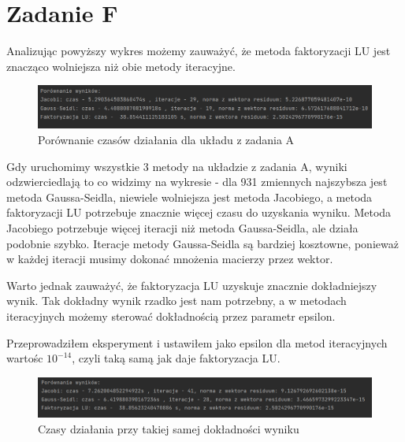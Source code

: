 \documentclass[fleqn]{article}
\begin{document}
    \section{Zadanie F}
    Analizując powyższy wykres możemy zauważyć, że metoda faktoryzacji LU jest znacząco wolniejsza
    niż obie metody iteracyjne.
    \begin{figure}[h]

        \centering
        \includegraphics[width=\textwidth]{LUJacGS.png}
        \centering
        \caption{Porównanie czasów działania dla układu z zadania A}

    \end{figure}

    \noindent Gdy uruchomimy wszystkie 3 metody na układzie z zadania A, 
    wyniki odzwierciedlają to co widzimy na wykresie - dla 931 zmiennych najszybsza jest metoda 
    Gaussa-Seidla, niewiele wolniejsza jest metoda Jacobiego, a metoda faktoryzacji LU potrzebuje 
    znacznie więcej czasu do uzyskania wyniku. Metoda Jacobiego potrzebuje więcej iteracji niż metoda
    Gaussa-Seidla, ale działa podobnie szybko. Iteracje metody Gaussa-Seidla są bardziej kosztowne,
    ponieważ w każdej iteracji musimy dokonać mnożenia macierzy przez wektor.

    \noindent Warto jednak zauważyć, że faktoryzacja LU uzyskuje znacznie dokładniejszy wynik.
    Tak dokładny wynik rzadko jest nam potrzebny, a w metodach iteracyjnych możemy 
    sterować dokładnością przez parametr epsilon.

    \noindent Przeprowadziłem eksperyment i ustawiłem jako epsilon dla metod iteracyjnych wartośc $10^{-14}$,
    czyli taką samą jak daje faktoryzacja LU.

    \begin{figure}[h]

        \centering
        \includegraphics[width=\textwidth]{tasamadok.png}
        \centering
        \caption{Czasy działania przy takiej samej dokładności wyniku}

    \end{figure}
\end{document}
